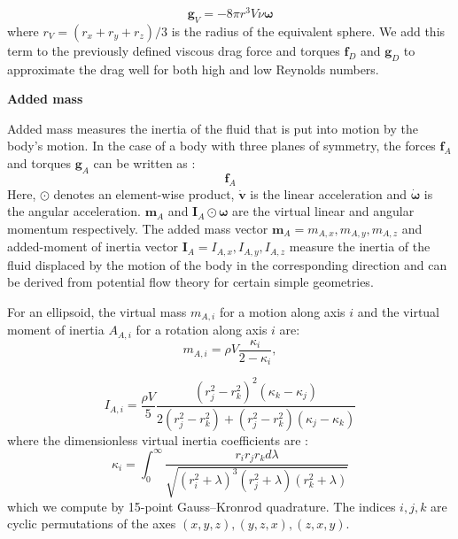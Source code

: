 \documentclass[sn-mathphys-num]{sn-jnl}%
\theoremstyle{thmstyleone}%
\theoremstyle{thmstyletwo}%
\theoremstyle{thmstylethree}%
\begin{document}
\begin{appendices}
\begin{equation}\label{eq:g_V}
	\mathbf{g}_V = -8 \pi r^3 V \nu \mathbf{\omega}
\end{equation}
%
where $ r_V = (r_x + r_y +r_z) / 3 $ is the radius of the equivalent sphere. 
We add this term to the previously defined viscous drag force and torques $ \mathbf{f}_D $ and $ \mathbf{g}_D $ to approximate the drag well for both high and low Reynolds numbers.






\textbf{Added mass}

Added mass measures the inertia of the fluid that is put into motion by the body's motion. 
In the case of a body with three planes of symmetry, the forces $ \mathbf{f}_A $ and torques $ \mathbf{g}_A $ can be written as \cite{birkhoff2015hydrodynamics}:
%
\begin{equation}\label{key}
	\mathbf{f}_A
\end{equation}
%
Here, $ \odot $ denotes an element-wise product, $ \dot{\mathbf{v}} $ is the linear acceleration and $\dot{\mathbf{\omega}}$ is the angular acceleration.
$ \mathbf{m}_A $ and $ \mathbf{I}_A \odot \mathbf{\omega} $ are the virtual linear and angular momentum respectively. 
The added mass vector $ \mathbf{m}_A = { m_{A,x}, m_{A, y}, m_{A, z} } $ and added-moment of inertia vector $ \mathbf{I}_A = {I_{A,x}, I_{A,y}, I_{A,z}} $ measure the inertia of the fluid displaced by the motion of the body in the corresponding direction and can be derived from potential flow theory for certain simple geometries.


For an ellipsoid, the virtual mass $ m_{A, i} $ for a motion along axis $ i $ and the virtual moment of inertia $ A_{A,i} $ for a rotation along axis $ i $ are:
%
\begin{equation}\label{eq:virtual_mass}
	m_{A, i} = 
	\rho
	V
	\frac{\kappa_i}{2-\kappa_i},
\end{equation}

\begin{equation}\label{eq:virtual_inertia}
	I_{A, i} = 
	\frac{\rho V}{5}
	\frac{
		(r_j^2 - r_k^2)^2
		(\kappa_k - \kappa_j)
	}{
		2 (r_j^2 - r_k^2)
		+ (r_j^2 - r_k^2)
		(\kappa_j - \kappa_k)
	}
\end{equation}
where the dimensionless virtual inertia coefficients are \cite{tuckerman1925inertia}:
%
\begin{equation}\label{eq:inertia_coefficient}
	\kappa_i = 
		\int_{0}^{\infty}
		\frac{
			r_i r_j r_k d \lambda
		}{
			\sqrt{
				(r_i^2 + \lambda)^3
				(r_j^2 + \lambda)
				(r_k^2 + \lambda)
			}
		}
\end{equation}
%
which we compute by 15-point Gauss–Kronrod quadrature. 
The indices $ i, j, k $ are cyclic permutations of the axes $ (x, y, z), (y, z, x), (z, x, y) $.



\end{appendices}
\end{document}

